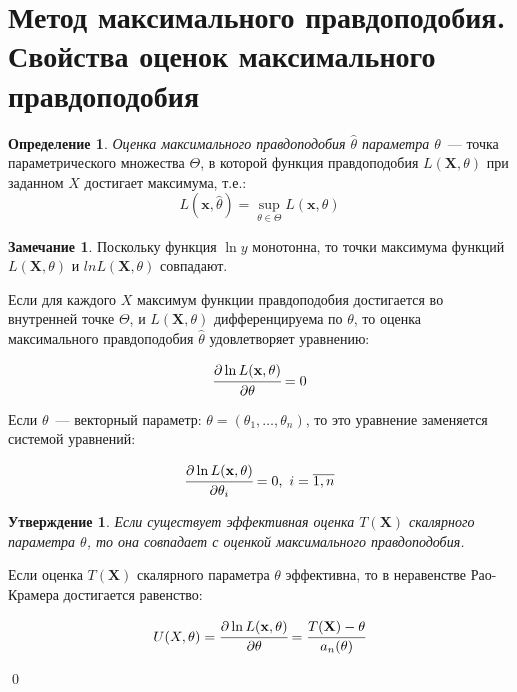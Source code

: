 \documentclass[oneside,final,14pt]{extreport}
\renewenvironment{proof}{{\bfseries Доказательство.}}{\qed}
\theoremstyle{plain}
\newtheorem*{thm*}{Утверждение}
\theoremstyle{definition}
\newtheorem*{defn}{Определение}
\newtheorem*{rmrk}{Замечание}
\theoremstyle{named}
\begin{document}
\section{Метод максимального правдоподобия. Свойства оценок максимального правдоподобия}

\begin{defn}
{\it Оценка максимального правдоподобия $\hat{\theta}$ параметра $\theta$}~--- точка параметрического множества $\Theta$, в которой функция правдоподобия $L(\mathbf{X},\theta)$ при заданном $X$ достигает максимума, т.е.:
\begin{equation*}
    L(\boldsymbol{x}, \hat{\theta})=\sup\limits_{\theta \in \Theta} L(\boldsymbol{x}, \theta)
\end{equation*}
\end{defn}

\begin{rmrk}
Поскольку функция $\operatorname{ln}y$ монотонна, то точки максимума функций $L(\mathbf{X},\theta)$ и $ln L(\mathbf{X},\theta)$ совпадают.
\end{rmrk}

Если для каждого $X$ максимум функции правдоподобия достигается во внутренней точке $\Theta$, и $L(\mathbf{X},\theta)$ дифференцируема по $\theta$, то оценка максимального правдоподобия $\hat{\theta}$ удовлетворяет уравнению:

\begin{equation*}
    \cfrac{\partial \ln L(\mathbf{x}, \theta)}{\partial \theta}=0
\end{equation*}

Если $\theta$~--- векторный параметр: $\theta=\left(\theta_{1}, \ldots, \theta_{n}\right)$, то это уравнение заменяется системой уравнений:

\begin{equation*}
    \cfrac{\partial \ln L(\mathbf{x}, \theta)}{\partial \theta_{i}}=0,~ i=\overline{1, n} 
\end{equation*}


\begin{thm*}
Если существует эффективная оценка $T(\mathbf{X})$ скалярного параметра $\theta$, то она совпадает с оценкой максимального правдоподобия.
\end{thm*}

\begin{proof}
Если оценка $T(\mathbf{X})$ скалярного параметра $\theta$ эффективна, то в неравенстве Рао-Крамера достигается равенство:

\begin{equation*}
    U(X,\theta) = \cfrac{\partial \ln L(\mathbf{x}, \theta)}{\partial \theta}=\cfrac{T(\mathbf{X})-\theta}{a_n(\theta)}
\end{equation*}

\end{proof}
\end{document}
